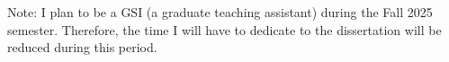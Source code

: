 \documentclass{article}
\theoremstyle{definition}
\theoremstyle{remark}
\begin{document}
Note: I plan to be a GSI (a graduate teaching assistant) during the Fall 2025
semester. Therefore, the time I will have to dedicate to the dissertation will
be reduced during this period.


% 


% 
\end{document}
